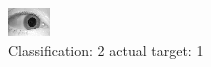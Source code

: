 \begin{figure}[h!]
\begin{center}
\includegraphics[width=0.60\columnwidth]{figures/ID1441_class_2_target_1.png}
\end{center}
\caption{ Classification: 2 actual target: 1}
\label{fig:ID1441_class_2_target_1}
\end{figure}
